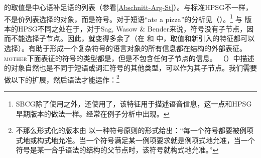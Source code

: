\noindent
\comps{}的取值是中心语补足语的列表（参看\ref{Abschnitt-Arg-St}）。与标准HPSG\indexhpsgc 不一样，不是价列表选择的对象，而是符号。对于短语“ate a pizza”的分析见（）。\footnote{%
  SBCG除了使用\phonfc 之外，还使用了\formfc，该特征用于描述语音信息，这一点和HPSG早期版本的做法一样\citep[\S~3.1, \S~3.6]{Sag2012a}。\formfc 经常在例子分析中出现。
}
\ea
\label{feat-geom-swb}
\z
与 \citet{ps2}版本的HPSG不同之处在于，对于Sag, Wasow \& Bender来说，符号没有子节点，因而不能选择子节点。因此，\synsemfc{}就变得多余了（在 和 中，\phonvc 取值和新引入的\formfc 特征都可以选择）。有助于形成一个复杂符号的语言对象的所有信息都在结构的外部表征。\textsc{mother}下面表征的符号的类型都是，但是不包含任何子节点的信息。 （）中描述的对象自然也是不同于短语或词汇符号的其他类型，可以作为其子节点。我们需要做以下的扩展，然后语法才能运作\citep*[]{SWB2003a}：\footnote{%
不那么形式化的版本由 \citet[]{Sag2012a}以一种符号原则的形式给出：“每一个符号都要被例项式地或构式地允准。当一个符号满足某一例项要求就是例项式地允准，当一个符号是某一合乎语法的结构的父节点时，该符号就构式地允准。” 
}
